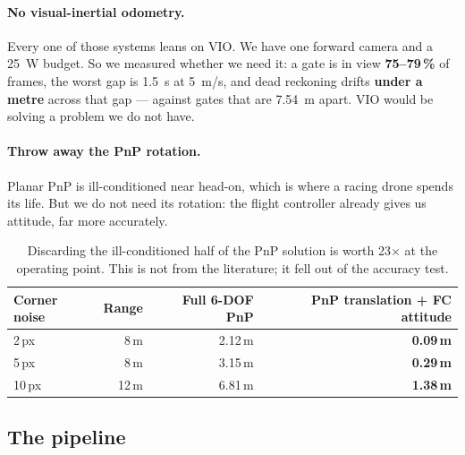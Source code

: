 \paragraph{No visual-inertial odometry.} Every one of those systems leans on VIO.
We have one forward camera and a \SI{25}{W} budget. So we measured whether we
need it: a gate is in view \textbf{75--79\,\%} of frames, the worst gap is
\SI{1.5}{s} at \SI{5}{m/s}, and dead reckoning drifts \textbf{under a metre}
across that gap --- against gates that are \SI{7.54}{m} apart. VIO would be
solving a problem we do not have.

\paragraph{Throw away the PnP rotation.} Planar PnP is ill-conditioned near
head-on, which is where a racing drone spends its life. But we do not need its
rotation: the flight controller already gives us attitude, far more accurately.

\begin{table}[H]\centering\footnotesize
\begin{tabular}{@{}lrrr@{}}
\toprule
Corner noise & Range & Full 6-DOF PnP & \textbf{PnP translation + FC attitude} \\
\midrule
2\,px & 8\,m & 2.12\,m & \textbf{0.09\,m} \\
5\,px & 8\,m & 3.15\,m & \textbf{0.29\,m} \\
10\,px & 12\,m & 6.81\,m & \textbf{1.38\,m} \\
\bottomrule
\end{tabular}
\caption{Discarding the ill-conditioned half of the PnP solution is worth 23$\times$ at the operating point. This is not from the literature; it fell out of the accuracy test.}\label{tab:pnp}
\end{table}

\subsection{The pipeline}

